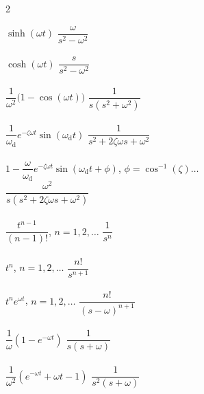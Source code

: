 \documentclass[12pt,letter]{article}
\begin{document}
{\begin{multicols}{2}
\begin{center}
\begin{tabbing}
				$\sinh (\omega t) $	\> $\dfrac{\omega}{s^2-\omega^2}$ \>\LTNUM \\ \\
				$\cosh (\omega t) $	\> $\dfrac{s}{s^2-\omega^2}$ \>\LTNUM \\ \\
				$\dfrac{1}{\omega^2}\big(1-\cos(\omega t)\big)$ \> $\dfrac{1}{s(s^2+\omega^2)}$ \>\LTNUM \\ \\
				$\dfrac{1}{\omega_\text{d}}e^{-\zeta \omega t}\sin(\omega_\text{d} t)$ \> $\dfrac{1}{s^2+2\zeta \omega s+\omega^2}$ \>\LTNUM \\ \\
				$1-\dfrac{\omega}{\omega_\text{d}}e^{-\zeta \omega t}\sin(\omega_\text{d} t + \phi)$, $\phi =\cos^{-1}(\zeta) \dots $ \\ \> $\dfrac{\omega^2}{s(s^2+2\zeta \omega s+\omega^2)}$ \>\LTNUM \\ \\
				$\dfrac{t^{n-1}}{(n-1)!}$, $ n=1,2,\dots $ \> $\dfrac{1}{s^n}$ \>\LTNUM \\ \\
				$t^n $, $n=1,2,\dots$     \> $\dfrac{n!}{s^{n+1}}$    \>\LTNUM \\ \\
				$t^ne^{\omega t}$, $ n=1,2,\dots $	\> $\dfrac{n!}{(s-\omega)^{n+1}}$	\>\LTNUM \\ \\
				$\dfrac{1}{\omega}(1-e^{-\omega t}) $	\> $\dfrac{1}{s(s+\omega)}$	\>\LTNUM \\ \\
				$\dfrac{1}{\omega^2}(e^{-\omega t}+\omega t - 1) $	\> $\dfrac{1}{s^2(s+\omega)}$	\>\LTNUM \\ \\
			\end{tabbing}
			\end{center}
			
			\columnbreak
			

\end{multicols}}
\end{document}
